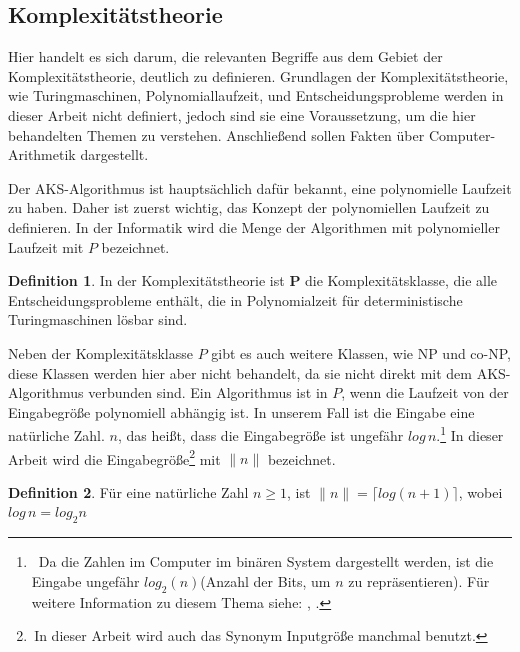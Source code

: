 \documentclass[12pt,oneside]{article}
\theoremstyle{remark}
\theoremstyle{definition}
\newtheorem{definition}{Definition}[section]
\begin{document}
\smallskip

\subsection{Komplexitätstheorie}

Hier handelt es sich darum, die relevanten Begriffe aus dem Gebiet der Komplexitätstheorie, deutlich zu definieren. Grundlagen der Komplexitätstheorie, wie Turingmaschinen, Polynomiallaufzeit, und Entscheidungsprobleme werden in dieser Arbeit nicht definiert, jedoch sind sie eine Voraussetzung, um die hier behandelten Themen zu verstehen. Anschließend sollen Fakten über Computer-Arithmetik dargestellt.  

Der AKS-Algorithmus ist hauptsächlich dafür bekannt, eine polynomielle Laufzeit zu haben. Daher ist zuerst wichtig, das Konzept der polynomiellen Laufzeit zu definieren. In der Informatik wird die Menge der Algorithmen mit polynomieller Laufzeit mit $P$ bezeichnet.

\begin{definition}
In der Komplexitätstheorie ist \textbf{P} die Komplexitätsklasse, die alle Entscheidungsprobleme enthält, die in Polynomialzeit für deterministische Turingmaschinen lösbar sind. 
\end{definition}

Neben der Komplexitätsklasse $P$ gibt es auch weitere Klassen, wie NP und co-NP, diese Klassen werden hier aber nicht behandelt, da sie nicht direkt mit dem AKS-Algorithmus verbunden sind. Ein Algorithmus ist in $P$, wenn die Laufzeit von der Eingabegröße polynomiell abhängig ist. In unserem Fall ist die Eingabe eine natürliche Zahl. $n$, das heißt, dass die Eingabegröße ist ungefähr $log \, n$.\footnote{$\,$ Da die Zahlen im Computer im binären System dargestellt werden, ist die Eingabe ungefähr $log_2(n)$(Anzahl der Bits, um $n$ zu repräsentieren). Für weitere Information zu diesem Thema siehe: \cite{D73}, \cite{computer-algebra}.} In dieser Arbeit wird die Eingabegröße\footnote{$\, $In dieser Arbeit wird auch das Synonym Inputgröße manchmal benutzt.} mit $\lVert n \rVert$ bezeichnet.   

\begin{definition}
Für eine natürliche Zahl $n \geq 1$, ist $\lVert n \rVert= \lceil log(n + 1) \rceil$, wobei $log \, n = log_{2} n$
\end{definition}
\end{document}
